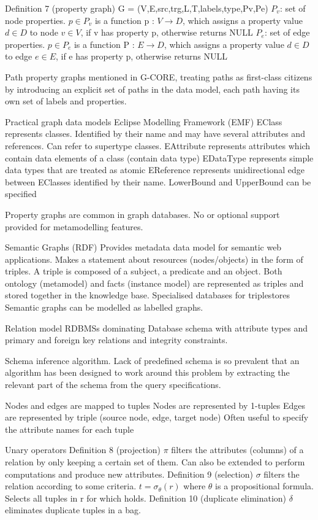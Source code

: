 Definition 7 (property graph) G = (V,E,src,trg,L,T,labels,type,Pv,Pe)
$P_v$: set of node properties. $p \in P_v$ is a function p : $V \rightarrow D$, which assigns a property value $d \in D$ to node $v \in V$, if v has property p, otherwise returns NULL    
$P_e$: set of edge properties. $p \in P_e$ is a function P : $E \rightarrow D$, which assigns a property value $d \in D$ to edge $e \in E$, if e has property p, otherwise returns NULL 

Path property graphs mentioned in G-CORE, treating paths as first-class citizens by introducing an explicit set of paths in the data model, each path having its own set of labels and properties.

Practical graph data models
Eclipse Modelling Framework (EMF) 
EClass represents classes. Identified by their name and may have several attributes and references. Can refer to supertype classes.
EAttribute represents attributes which contain data elements of a class (contain data type)
EDataType represents simple data types that are treated as atomic
EReference represents unidirectional edge between EClasses identified by their name. LowerBound and UpperBound can be specified

Property graphs are common in graph databases. No or optional support provided for metamodelling features. 

Semantic Graphs (RDF)
Provides metadata data model for semantic web applications. 
Makes a statement about resources (nodes/objects) in the form of triples. A triple is composed of a subject, a predicate and an object. Both ontology (metamodel) and facts (instance model) are represented as triples and stored together in the knowledge base. 
Specialised databases for triplestores
Semantic graphs can be modelled as labelled graphs. 

Relation model 
RDBMSs dominating
Database schema with attribute types and primary and foreign key relations and integrity constraints. 

Schema inference algorithm. Lack of predefined schema is so prevalent that an algorithm has been designed to work around this problem by extracting the relevant part of the schema from the query specifications. 

Nodes and edges are mapped to tuples
Nodes are represented by 1-tuples
Edges are represented by triple (source node, edge, target node)
Often useful to specify the attribute names for each tuple

Unary operators
Definition 8 (projection) $\pi$ filters the attributes (columns) of a relation by only keeping a certain set of them. Can also be extended to perform computations and produce new attributes. 
Definition 9 (selection) $\sigma$ filters the relation according to some criteria. $t = \sigma_\theta(r)$ where $\theta$ is a propositional formula. Selects all tuples in r for which holds. 
Definition 10 (duplicate elimination) $\delta$ eliminates duplicate tuples in a bag. 

